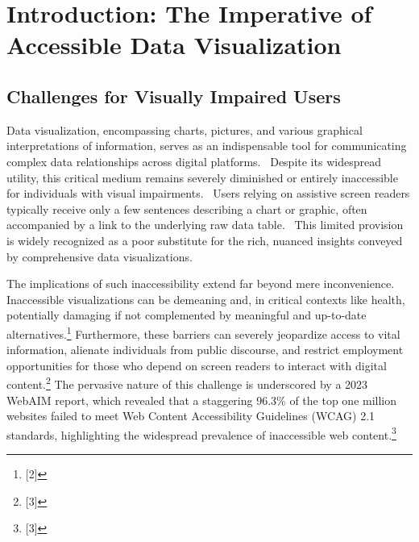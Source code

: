 \section{Introduction: The Imperative of Accessible Data Visualization}

\subsection{Challenges for Visually Impaired Users}
Data visualization, encompassing charts, pictures, and various graphical interpretations of information, serves as an indispensable tool for communicating complex data relationships across digital platforms.~ \cite{ChallengesForVisuallyImpairedUsers} Despite its widespread utility, this critical medium remains severely diminished or entirely inaccessible for individuals with visual impairments.~ \cite{ChallengesForVisuallyImpairedUsers} Users relying on assistive screen readers typically receive only a few sentences describing a chart or graphic, often accompanied by a link to the underlying raw data table.~ \cite{ChallengesForVisuallyImpairedUsers} This limited provision is widely recognized as a poor substitute for the rich, nuanced insights conveyed by comprehensive data visualizations.~ \cite{ChallengesForVisuallyImpairedUsers}

The implications of such inaccessibility extend far beyond mere inconvenience. Inaccessible visualizations can be demeaning and, in critical contexts like health, potentially damaging if not complemented by meaningful and up-to-date alternatives.\footnote{[2]} Furthermore, these barriers can severely jeopardize access to vital information, alienate individuals from public discourse, and restrict employment opportunities for those who depend on screen readers to interact with digital content.\footnote{[3]} The pervasive nature of this challenge is underscored by a 2023 WebAIM report, which revealed that a staggering 96.3\% of the top one million websites failed to meet Web Content Accessibility Guidelines (WCAG) 2.1 standards, highlighting the widespread prevalence of inaccessible web content.\footnote{[3]}

